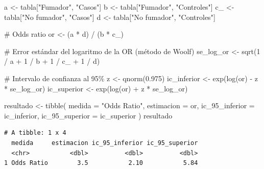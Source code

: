 \documentclass[
  spanish,
  a4paper,
]{scrreport}
\newenvironment{Shaded}{\begin{snugshade}}{\end{snugshade}}
\newcommand{\AttributeTok}[1]{\textcolor[rgb]{0.40,0.45,0.13}{#1}}
\newcommand{\CommentTok}[1]{\textcolor[rgb]{0.37,0.37,0.37}{#1}}
\newcommand{\DecValTok}[1]{\textcolor[rgb]{0.68,0.00,0.00}{#1}}
\newcommand{\FloatTok}[1]{\textcolor[rgb]{0.68,0.00,0.00}{#1}}
\newcommand{\FunctionTok}[1]{\textcolor[rgb]{0.28,0.35,0.67}{#1}}
\newcommand{\NormalTok}[1]{\textcolor[rgb]{0.00,0.23,0.31}{#1}}
\newcommand{\OtherTok}[1]{\textcolor[rgb]{0.00,0.23,0.31}{#1}}
\newcommand{\SpecialCharTok}[1]{\textcolor[rgb]{0.37,0.37,0.37}{#1}}
\newcommand{\StringTok}[1]{\textcolor[rgb]{0.13,0.47,0.30}{#1}}
\theoremstyle{definition}
\theoremstyle{definition}
\theoremstyle{remark}
\begin{document}
\begin{Shaded}
\begin{Highlighting}[]
\NormalTok{a }\OtherTok{\textless{}{-}}\NormalTok{ tabla[}\StringTok{"Fumador"}\NormalTok{, }\StringTok{"Casos"}\NormalTok{]}
\NormalTok{b }\OtherTok{\textless{}{-}}\NormalTok{ tabla[}\StringTok{"Fumador"}\NormalTok{, }\StringTok{"Controles"}\NormalTok{]}
\NormalTok{c\_ }\OtherTok{\textless{}{-}}\NormalTok{ tabla[}\StringTok{"No fumador"}\NormalTok{, }\StringTok{"Casos"}\NormalTok{]}
\NormalTok{d }\OtherTok{\textless{}{-}}\NormalTok{ tabla[}\StringTok{"No fumador"}\NormalTok{, }\StringTok{"Controles"}\NormalTok{]}

\CommentTok{\# Odds ratio}
\NormalTok{or }\OtherTok{\textless{}{-}}\NormalTok{ (a }\SpecialCharTok{*}\NormalTok{ d) }\SpecialCharTok{/}\NormalTok{ (b }\SpecialCharTok{*}\NormalTok{ c\_)}

\CommentTok{\# Error estándar del logaritmo de la OR (método de Woolf)}
\NormalTok{se\_log\_or }\OtherTok{\textless{}{-}} \FunctionTok{sqrt}\NormalTok{(}\DecValTok{1} \SpecialCharTok{/}\NormalTok{ a }\SpecialCharTok{+} \DecValTok{1} \SpecialCharTok{/}\NormalTok{ b }\SpecialCharTok{+} \DecValTok{1} \SpecialCharTok{/}\NormalTok{ c\_ }\SpecialCharTok{+} \DecValTok{1} \SpecialCharTok{/}\NormalTok{ d)}

\CommentTok{\# Intervalo de confianza al 95\%}
\NormalTok{z }\OtherTok{\textless{}{-}} \FunctionTok{qnorm}\NormalTok{(}\FloatTok{0.975}\NormalTok{)}
\NormalTok{ic\_inferior }\OtherTok{\textless{}{-}} \FunctionTok{exp}\NormalTok{(}\FunctionTok{log}\NormalTok{(or) }\SpecialCharTok{{-}}\NormalTok{ z }\SpecialCharTok{*}\NormalTok{ se\_log\_or)}
\NormalTok{ic\_superior }\OtherTok{\textless{}{-}} \FunctionTok{exp}\NormalTok{(}\FunctionTok{log}\NormalTok{(or) }\SpecialCharTok{+}\NormalTok{ z }\SpecialCharTok{*}\NormalTok{ se\_log\_or)}

\NormalTok{resultado }\OtherTok{\textless{}{-}} \FunctionTok{tibble}\NormalTok{(}
  \AttributeTok{medida =} \StringTok{"Odds Ratio"}\NormalTok{,}
  \AttributeTok{estimacion =}\NormalTok{ or,}
  \AttributeTok{ic\_95\_inferior =}\NormalTok{ ic\_inferior,}
  \AttributeTok{ic\_95\_superior =}\NormalTok{ ic\_superior}
\NormalTok{)}
\NormalTok{resultado}
\end{Highlighting}
\end{Shaded}

\begin{verbatim}
# A tibble: 1 x 4
  medida     estimacion ic_95_inferior ic_95_superior
  <chr>           <dbl>          <dbl>          <dbl>
1 Odds Ratio        3.5           2.10           5.84
\end{verbatim}
\end{document}
